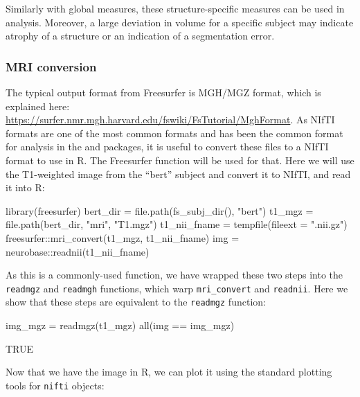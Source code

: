 Similarly with global measures, these structure-specific measures can be
used in analysis. Moreover, a large deviation in volume for a specific
subject may indicate atrophy of a structure or an indication of a
segmentation error.

\subsubsection{MRI conversion}\label{mri-conversion}

The typical output format from Freesurfer is MGH/MGZ format, which is
explained here:
\url{https://surfer.nmr.mgh.harvard.edu/fswiki/FsTutorial/MghFormat}. As
NIfTI formats are one of the most common formats and has been the common
format for analysis in the  and  packages,
it is useful to convert these files to a NIfTI format to use in R. The
 Freesurfer function will be used for that. Here we
will use the T1-weighted image from the ``bert'' subject and convert it
to NIfTI, and read it into R:

\begin{Schunk}
\begin{Sinput}
library(freesurfer)
bert_dir = file.path(fs_subj_dir(), "bert")
t1_mgz = file.path(bert_dir, "mri", "T1.mgz")
t1_nii_fname = tempfile(fileext = ".nii.gz")
freesurfer::mri_convert(t1_mgz, t1_nii_fname)
img = neurobase::readnii(t1_nii_fname)
\end{Sinput}
\end{Schunk}

As this is a commonly-used function, we have wrapped these two steps
into the \texttt{readmgz} and \texttt{readmgh} functions, which warp
\texttt{mri\_convert} and \texttt{readnii}. Here we show that these
steps are equivalent to the \texttt{readmgz} function:

\begin{Schunk}
\begin{Sinput}
img_mgz = readmgz(t1_mgz)
all(img == img_mgz)
\end{Sinput}
\begin{Soutput}
[1] TRUE
\end{Soutput}
\end{Schunk}

Now that we have the image in R, we can plot it using the standard
plotting tools for \texttt{nifti} objects:

